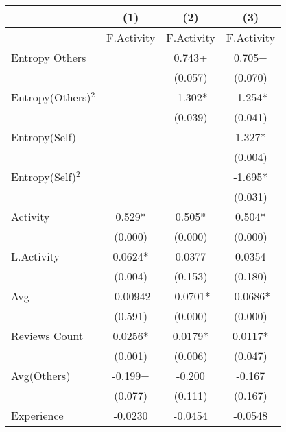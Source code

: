\begin{table}[]
\centering
\begin{tabular}{@{}lccc@{}}
\toprule
                                   & (1)        & (2)        & (3)        \\ \midrule
                                   & F.Activity & F.Activity & F.Activity \\
Entropy Others                     &            & 0.743+     & 0.705+     \\
                                   &            & (0.057)    & (0.070)    \\
Entropy(Others)$^2$ 			   &            & -1.302*    & -1.254*    \\
                                   &            & (0.039)    & (0.041)    \\
Entropy(Self)                      &            &            & 1.327*     \\
                                   &            &            & (0.004)    \\
Entropy(Self)$^2$                  &            &            & -1.695*    \\
                                   &            &            & (0.031)    \\
Activity                           & 0.529*     & 0.505*     & 0.504*     \\
                                   & (0.000)    & (0.000)    & (0.000)    \\
L.Activity                         & 0.0624*    & 0.0377     & 0.0354     \\
                                   & (0.004)    & (0.153)    & (0.180)    \\
Avg                                & -0.00942   & -0.0701*   & -0.0686*   \\
                                   & (0.591)    & (0.000)    & (0.000)    \\
Reviews Count                      & 0.0256*    & 0.0179*    & 0.0117*    \\
                                   & (0.001)    & (0.006)    & (0.047)    \\
Avg(Others)                        & -0.199+    & -0.200     & -0.167     \\
                                   & (0.077)    & (0.111)    & (0.167)    \\
Experience                         & -0.0230    & -0.0454    & -0.0548    \\

\end{tabular}
\end{table}
